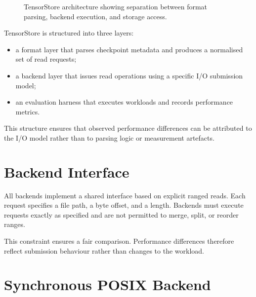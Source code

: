 \documentclass[]{final_report}
\begin{document}
\begin{figure}[h]
\centering
{}
\caption{TensorStore architecture showing separation between format parsing, backend execution, and storage access.}
\label{fig:tensorstore-arch}
\end{figure}

TensorStore is structured into three layers:

\begin{itemize}
    \item a format layer that parses checkpoint metadata and produces a normalised set of read requests;
    \item a backend layer that issues read operations using a specific I/O submission model;
    \item an evaluation harness that executes workloads and records performance metrics.
\end{itemize}

This structure ensures that observed performance differences can be attributed to the I/O model rather than to parsing logic or measurement artefacts.

\section{Backend Interface}

All backends implement a shared interface based on explicit ranged reads. Each request specifies a file path, a byte offset, and a length. Backends must execute requests exactly as specified and are not permitted to merge, split, or reorder ranges.

This constraint ensures a fair comparison. Performance differences therefore reflect submission behaviour rather than changes to the workload.

\section{Synchronous POSIX Backend}
\end{document}
